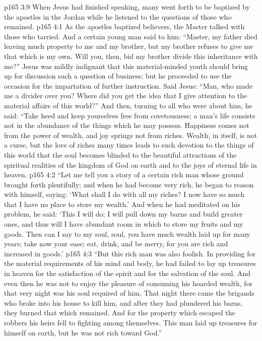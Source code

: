 \vs p165 3:9 \pc When Jesus had finished speaking, many went forth to be baptized by the apostles in the Jordan while he listened to the questions of those who remained.
\vs p165 4:1 As the apostles baptized believers, the Master talked with those who tarried. And a certain young man said to him: “Master, my father died leaving much property to me and my brother, but my brother refuses to give me that which is my own. Will you, then, bid my brother divide this inheritance with me?” Jesus was mildly indignant that this material\hyp{}minded youth should bring up for discussion such a question of business; but he proceeded to use the occasion for the impartation of further instruction. Said Jesus: \textcolor{ubdarkred}{“Man, who made me a divider over you? Where did you get the idea that I give attention to the material affairs of this world?”} And then, turning to all who were about him, he said: \textcolor{ubdarkred}{“Take heed and keep yourselves free from covetousness; a man’s life consists not in the abundance of the things which he may possess. Happiness comes not from the power of wealth, and joy springs not from riches. Wealth, in itself, is not a curse, but the love of riches many times leads to such devotion to the things of this world that the soul becomes blinded to the beautiful attractions of the spiritual realities of the kingdom of God on earth and to the joys of eternal life in heaven.}
\vs p165 4:2 \pc \textcolor{ubdarkred}{“Let me tell you a story of a certain rich man whose ground brought forth plentifully; and when he had become very rich, he began to reason with himself, saying: ‘What shall I do with all my riches? I now have so much that I have no place to store my wealth.’ And when he had meditated on his problem, he said: ‘This I will do; I will pull down my barns and build greater ones, and thus will I have abundant room in which to store my fruits and my goods. Then can I say to my soul, soul, you have much wealth laid up for many years; take now your ease; eat, drink, and be merry, for you are rich and increased in goods.’}
\vs p165 4:3 \textcolor{ubdarkred}{“But this rich man was also foolish. In providing for the material requirements of his mind and body, he had failed to lay up treasures in heaven for the satisfaction of the spirit and for the salvation of the soul. And even then he was not to enjoy the pleasure of consuming his hoarded wealth, for that very night was his soul required of him. That night there came the brigands who broke into his house to kill him, and after they had plundered his barns, they burned that which remained. And for the property which escaped the robbers his heirs fell to fighting among themselves. This man laid up treasures for himself on earth, but he was not rich toward God.”}
